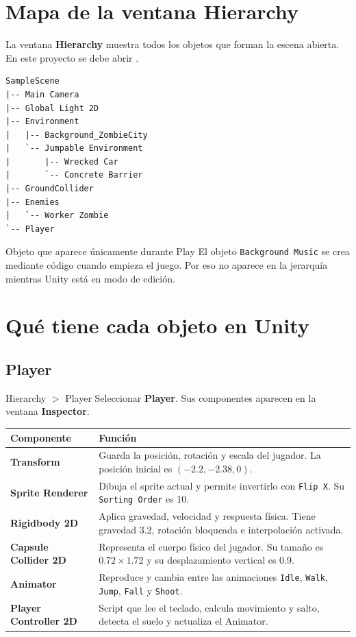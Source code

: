 \documentclass[11pt,a4paper]{article}
\begin{document}
\section{Mapa de la ventana Hierarchy}

La ventana \textbf{Hierarchy} muestra todos los objetos que forman la escena abierta. En este proyecto se debe abrir .

\begin{lstlisting}[style=projecttree]
SampleScene
|-- Main Camera
|-- Global Light 2D
|-- Environment
|   |-- Background_ZombieCity
|   `-- Jumpable Environment
|       |-- Wrecked Car
|       `-- Concrete Barrier
|-- GroundCollider
|-- Enemies
|   `-- Worker Zombie
`-- Player
\end{lstlisting}

\begin{warningbox}{Objeto que aparece únicamente durante Play}
El objeto \texttt{Background Music} se crea mediante código cuando empieza el juego. Por eso no aparece en la jerarquía mientras Unity está en modo de edición.
\end{warningbox}

\section{Qué tiene cada objeto en Unity}

\subsection{Player}

\begin{unitybox}{Hierarchy $>$ Player}
Seleccionar \textbf{Player}. Sus componentes aparecen en la ventana \textbf{Inspector}.
\end{unitybox}

\begin{tabularx}{\textwidth}{>{\bfseries}p{}X}
\toprule
Componente & Función \\
\midrule
Transform & Guarda la posición, rotación y escala del jugador. La posición inicial es $(-2.2,-2.38,0)$. \\
Sprite Renderer & Dibuja el sprite actual y permite invertirlo con \texttt{Flip X}. Su \texttt{Sorting Order} es 10. \\
Rigidbody 2D & Aplica gravedad, velocidad y respuesta física. Tiene gravedad 3.2, rotación bloqueada e interpolación activada. \\
Capsule Collider 2D & Representa el cuerpo físico del jugador. Su tamaño es $0.72\times1.72$ y su desplazamiento vertical es 0.9. \\
Animator & Reproduce y cambia entre las animaciones \texttt{Idle}, \texttt{Walk}, \texttt{Jump}, \texttt{Fall} y \texttt{Shoot}. \\
Player Controller 2D & Script que lee el teclado, calcula movimiento y salto, detecta el suelo y actualiza el Animator. \\
\bottomrule
\end{tabularx}
\end{document}

